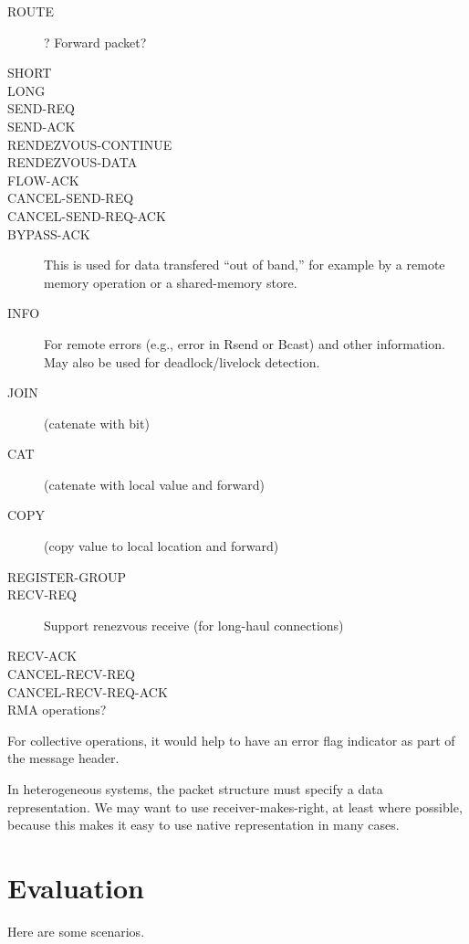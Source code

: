 \documentclass{article}
\begin{document}
\begin{description}
\item[ROUTE]? Forward packet?
\item[SHORT]
\item[LONG]
\item[SEND-REQ]
\item[SEND-ACK]
\item[RENDEZVOUS-CONTINUE]
\item[RENDEZVOUS-DATA]
\item[FLOW-ACK]
\item[CANCEL-SEND-REQ]
\item[CANCEL-SEND-REQ-ACK]
\item[BYPASS-ACK]This is used for data transfered ``out of band,'' for example
  by a remote memory operation or a shared-memory store.
\item[INFO]For remote errors (e.g., error in Rsend or Bcast) and other
  information.  May also be used for deadlock/livelock detection.

\item[JOIN](catenate with bit)
\item[CAT](catenate with local value and forward)
\item[COPY](copy value to local location and forward)
\item[REGISTER-GROUP]

\item[RECV-REQ]Support renezvous receive (for long-haul connections)
\item[RECV-ACK]
\item[CANCEL-RECV-REQ]
\item[CANCEL-RECV-REQ-ACK]

\item[RMA operations?]
\end{description}

For collective operations, it would help to have an error flag indicator as
part of the message header.

In heterogeneous systems, the packet structure must specify a data
representation.  We may want to use receiver-makes-right, at least where
possible, because this makes it easy to use native representation in many
cases.  

\section{Evaluation}

Here are some scenarios.
\end{document}
